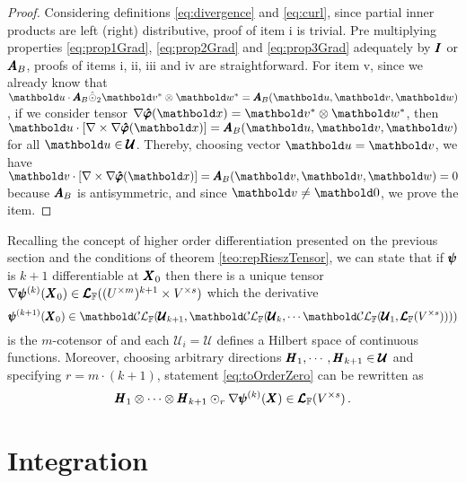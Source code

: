 {\footnotesize
\begin{proof}
Considering definitions \eqref{eq:divergence} and \eqref{eq:curl}, since partial inner products are left (right) distributive, proof of item i is trivial. Pre multiplying properties \eqref{eq:prop1Grad}, \eqref{eq:prop2Grad} and \eqref{eq:prop3Grad} adequately by $\pmb{I}$ or $\pmb{A}_B$, proofs of items i, ii, iii and iv are straightforward. For item v, since we already know that $\vto{u}\cdot\tnr{A}_B\hat{\odot}_2\vto{v}^*\otimes\vto{w}^*=\tnr{A}_B(\vto{u},\vto{v},\vto{w})$, if we consider tensor $\fua{{\nabla \tnr{\hat{\varphi}}}}{\vto{x}}=\vto{v}^*\otimes\vto{w}^*$, then $\vto{u}\cdot[\nabla\times\nabla\tnr{\hat{\varphi}}(\vto{x})]=\tnr{A}_B(\vto{u},\vto{v},\vto{w})$ for all $\vto{u}\in\tnr{\mathcal{U}}$. Thereby, choosing vector $\vto{u}=\vto{v}$, we have $\vto{v}\cdot[\nabla\times\nabla\tnr{\hat{\varphi}}(\vto{x})]=\tnr{A}_B(\vto{v},\vto{v},\vto{w})=0$ because $\pmb{A}_B$ is antisymmetric, and since $\vto{v}\neq\vto{0}$, we prove the item.
\end{proof}}


Recalling the concept of higher order differentiation presented on the previous section and the conditions of theorem \ref{teo:repRieszTensor}, we can state that if $\pmb{\psi}$ is $k+1$ differentiable at $\pmb{X}_0$ then there is a unique tensor $\nabla\pmb{\psi}^{(k)}(\pmb{X}_0)\in\pmb{\mathcal{L}}_{\mathbb{F}}((U^{\times m})^{k+1}\times V^{\times s})$ which the derivative
\begin{equation*}
\fua{\tnr{\psi}^{(k+1)}}{\tnr{X}_0}\in{\evlc{\cam{F}}{\pmb{\mathcal{U}}_{k+1}}{\evlc{\cam{F}}{\pmb{\mathcal{U}}_k}{\cdots\evlc{\cam{F}}{\pmb{\mathcal{U}}_{1}}{\ete{\cam{F}}{V^{\times s}}}}}}
\end{equation*}
is the $m$-cotensor of and each $\pmb{\mathcal{U}}_i=\pmb{\mathcal{U}}$ defines a Hilbert space of continuous functions. Moreover, choosing arbitrary directions $\pmb{H}_1,\cdots,\pmb{H}_{k+1}\in\pmb{\mathcal{U}}$ and specifying $r=m\cdot(k+1)$, statement \eqref{eq:toOrderZero} can be rewritten as
\begin{equation}
\pmb{H}_{1}\otimes\cdots\otimes\pmb{H}_{k+1}\odot_r\nabla\pmb{\psi}^{(k)}(\pmb{X})\in\pmb{\mathcal{L}}_{\mathbb{F}}(V^{\times s})\,.
\end{equation}


\section{Integration}

